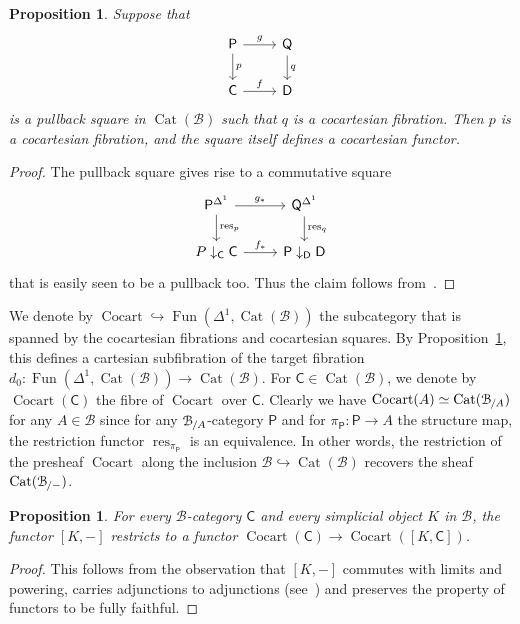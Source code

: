 \documentclass[reqno]{amsart}
\numberwithin{equation}{subsection}
\theoremstyle{plain}
\newtheorem{proposition}[equation]{Proposition}
\theoremstyle{definition}
\let\scr=\mathcal
\let\into=\hookrightarrow
\def\BB{\scr B}
\DeclareMathOperator{\Cat}{Cat}
\DeclareMathOperator{\Cocart}{Cocart}
\DeclareMathOperator{\Fun}{Fun}
\DeclareMathOperator{\res}{res}
\newcommand{\Over}[2]{#1_{\hspace{-1pt}/#2}}
\newcommand{\I}[1]{\mathsf{#1}}
\newcommand{\iFun}[2]{{[#1,#2]}}
\newcommand{\Comma}[3]{{#1}\downarrow_{#2}{#3}}
\begin{document}
\begin{proposition}
	\label{prop:pullbackCocartesianFibration}
	Suppose that
	\begin{equation*}
		\begin{tikzcd}
			\I{P}\arrow[d, "p"]\arrow[r, "g"] & \I{Q}\arrow[d, "q"]\\
			\I{C}\arrow[r, "f"] & \I{D}
		\end{tikzcd}
	\end{equation*}
	is a pullback square in $\Cat(\BB)$ such that $q$ is a cocartesian fibration. Then $p$ is a cocartesian fibration, and the square itself defines a cocartesian functor.
\end{proposition}
\begin{proof}
	The pullback square gives rise to a commutative square
	\begin{equation*}
	\begin{tikzcd}
	\I{P}^{\Delta^1}\arrow[d, "\res_p"]\arrow[r, "g_\ast"] & \I{Q}^{\Delta^1}\arrow[d, "\res_q"]\\
	\Comma{P}{\I{C}}{\I{C}}\arrow[r, "f_\ast"] & \Comma{\I{P}}{\I{D}}{\I{D}}
	\end{tikzcd}
	\end{equation*}
	that is easily seen to be a pullback too. Thus the claim follows from~\cite[Lemma~6.3.9]{Martini2021a}.
\end{proof}
We denote by $\Cocart\into \Fun(\Delta^1,\Cat(\BB))$ the subcategory that is spanned by the cocartesian fibrations and cocartesian squares. By Proposition~\ref{prop:pullbackCocartesianFibration}, this defines a cartesian subfibration of the target fibration $d_0\colon \Fun(\Delta^1,\Cat(\BB))\to\Cat(\BB)$. For $\I{C}\in\Cat(\BB)$, we denote by $\Cocart(\I{C})$ the fibre of $\Cocart$ over $\I{C}$. Clearly we have $\Cocart(A)\simeq \Cat(\Over{\BB}{A})$ for any $A\in\BB$ since for any $\Over{\BB}{A}$-category $\I{P}$ and for $\pi_{\I{P}}\colon \I{P}\to A$ the structure map, the restriction functor $\res_{\pi_{\I{P}}}$ is an equivalence. In other words, the restriction of the presheaf $\Cocart$ along the inclusion $\BB\into\Cat(\BB)$ recovers the sheaf $\Cat(\Over{\BB}{-})$.

\begin{proposition}
	For every $\BB$-category $\I{C}$ and every simplicial object $K$ in $\BB$, the functor $\iFun{K}{-}$ restricts to a functor $\Cocart(\I{C})\to\Cocart(\iFun{K}{\I{C}})$.
\end{proposition}
\begin{proof}
	This follows from the observation that $\iFun{K}{-}$ commutes with limits and powering, carries adjunctions to adjunctions (see~\cite[Corollary~3.1.11]{Martini2021a}) and preserves the property of functors to be fully faithful.
\end{proof}
\end{document}
